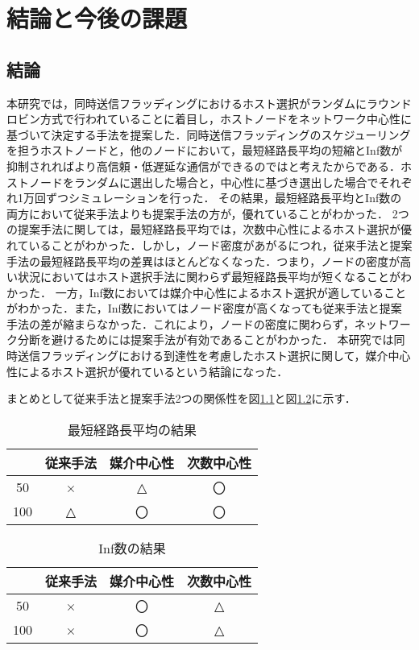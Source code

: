 \chapter{結論と今後の課題}

\section{結論}
本研究では，同時送信フラッディングにおけるホスト選択がランダムにラウンドロビン方式で行われていることに着目し，ホストノードをネットワーク中心性に基づいて決定する手法を提案した．同時送信フラッディングのスケジューリングを担うホストノードと，他のノードにおいて，最短経路長平均の短縮とInf数が抑制されればより高信頼・低遅延な通信ができるのではと考えたからである．ホストノードをランダムに選出した場合と，中心性に基づき選出した場合でそれぞれ1万回ずつシミュレーションを行った．
その結果，最短経路長平均とInf数の両方において従来手法よりも提案手法の方が，優れていることがわかった．
2つの提案手法に関しては，最短経路長平均では，次数中心性によるホスト選択が優れていることがわかった．しかし，ノード密度があがるにつれ，従来手法と提案手法の最短経路長平均の差異はほとんどなくなった．つまり，ノードの密度が高い状況においてはホスト選択手法に関わらず最短経路長平均が短くなることがわかった．
一方，Inf数においては媒介中心性によるホスト選択が適していることがわかった．また，Inf数においてはノード密度が高くなっても従来手法と提案手法の差が縮まらなかった．これにより，ノードの密度に関わらず，ネットワーク分断を避けるためには提案手法が有効であることがわかった．
本研究では同時送信フラッディングにおける到達性を考慮したホスト選択に関して，媒介中心性によるホスト選択が優れているという結論になった．

まとめとして従来手法と提案手法2つの関係性を図\ref{tab:5_spl}と図\ref{tab:5_inf}に示す．

\begin{table}[H]
  \caption{最短経路長平均の結果}
  \begin{tabular}{c|c|c|c} \hline\hline
    　 &従来手法& 媒介中心性 & 次数中心性  \\ \hline 
    50 & × & △ & 〇\\
    100& △ & 〇 & 〇 \\\hline\hline
  \end{tabular}
  \label{tab:5_spl}
\end{table}

\begin{table}[H]
  \caption{Inf数の結果}
  \begin{tabular}{c|c|c|c} \hline\hline
    　 &従来手法& 媒介中心性 & 次数中心性  \\ \hline 
    50 & × & 〇 & △\\
    100 & × & 〇& △ \\\hline\hline
  \end{tabular}
  \label{tab:5_inf}
\end{table}



